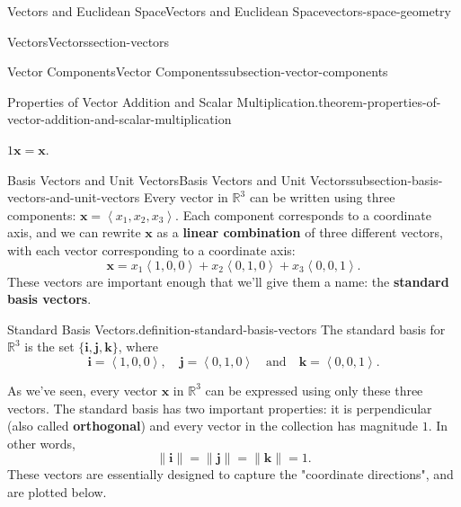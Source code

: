 \documentclass[oneside,10pt,]{book}
\newcommand{\terminology}[1]{\textbf{#1}}
\numberwithin{equation}{section}
\newcommand{\RR}{\mathbb{R}}
\newcommand{\vv}[1]{\mathbf{#1}}
\newcommand{\dotprod}[1]{\left\langle #1 \right\rangle}
\begin{document}
\begin{chapterptx}{Vectors and Euclidean Space}{}{Vectors and Euclidean Space}{}{}{vectors-space-geometry}
\begin{sectionptx}{Vectors}{}{Vectors}{}{}{section-vectors}
\begin{subsectionptx}{Vector Components}{}{Vector Components}{}{}{subsection-vector-components}
\begin{theorem}{Properties of Vector Addition and Scalar Multiplication.}{}{theorem-properties-of-vector-addition-and-scalar-multiplication}
\begin{multicols}{2}
\begin{enumerate}
\(1\vv{x} = \vv{x}.\)%
\end{enumerate}
\end{multicols}
\end{theorem}
\end{subsectionptx}
%
%
\typeout{************************************************}
\typeout{************************************************}
%
\begin{subsectionptx}{Basis Vectors and Unit Vectors}{}{Basis Vectors and Unit Vectors}{}{}{subsection-basis-vectors-and-unit-vectors}
\hypertarget{p-1107}{}%
Every vector in \(\RR^{3}\) can be written using three components: \(\vv{x} = \dotprod{x_{1},x_{2},x_{3}}.\) Each component corresponds to a coordinate axis, and we can rewrite \(\vv{x}\) as a \terminology{linear combination} of three different vectors, with each vector corresponding to a coordinate axis:%
%
\begin{equation*}
\vv{x} = x_{1}\dotprod{1,0,0}+x_{2}\dotprod{0,1,0}+x_{3}\dotprod{0,0,1}.
\end{equation*}
These vectors are important enough that we'll give them a name: the \terminology{standard basis vectors}. \begin{definition}{Standard Basis Vectors.}{definition-standard-basis-vectors}%
\hypertarget{p-1108}{}%
The standard basis for \(\RR^{3}\) is the set \(\{\vv{i},\vv{j},\vv{k}\}\), where%
%
\begin{equation*}
\vv{i} = \dotprod{1,0,0},\quad\vv{j} = \dotprod{0,1,0}\quad\text{and}\quad\vv{k} = \dotprod{0,0,1}.
\end{equation*}
\end{definition}
\hypertarget{p-1109}{}%
As we've seen, every vector \(\vv{x}\) in \(\RR^{3}\) can be expressed using only these three vectors. The standard basis has two important properties: it is perpendicular (also called \terminology{orthogonal}) and every vector in the collection has magnitude \(1\). In other words,%
%
\begin{equation*}
\|\vv{i}\| = \|\vv{j}\| = \|\vv{k}\| = 1.
\end{equation*}
\hypertarget{p-1110}{}%
These vectors are essentially designed to capture the "coordinate directions", and are plotted below.%
\begin{figure}
\centering
{
\begin{tikzpicture} [axis/.style={->,blue,thick}, 
    vector/.style={-stealth,red,very thick}, 
    vector guide/.style={dashed,red,thick}]

\end{tikzpicture}}
\end{figure}
\end{subsectionptx}
\end{sectionptx}
\end{chapterptx}
\end{document}
